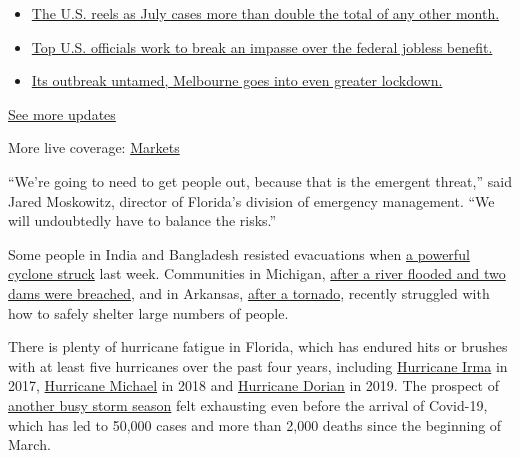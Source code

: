 \begin{itemize}
\tightlist
\item
  \href{https://www.nytimes.com/2020/08/01/world/coronavirus-covid-19.html?action=click\&pgtype=Article\&state=default\&region=MAIN_CONTENT_1\&context=storylines_live_updates\#link-34047410}{The
  U.S. reels as July cases more than double the total of any other
  month.}
\item
  \href{https://www.nytimes.com/2020/08/01/world/coronavirus-covid-19.html?action=click\&pgtype=Article\&state=default\&region=MAIN_CONTENT_1\&context=storylines_live_updates\#link-780ec966}{Top
  U.S. officials work to break an impasse over the federal jobless
  benefit.}
\item
  \href{https://www.nytimes.com/2020/08/01/world/coronavirus-covid-19.html?action=click\&pgtype=Article\&state=default\&region=MAIN_CONTENT_1\&context=storylines_live_updates\#link-2bc8948}{Its
  outbreak untamed, Melbourne goes into even greater lockdown.}
\end{itemize}

\href{https://www.nytimes.com/2020/08/01/world/coronavirus-covid-19.html?action=click\&pgtype=Article\&state=default\&region=MAIN_CONTENT_1\&context=storylines_live_updates}{See
more updates}

More live coverage:
\href{https://www.nytimes.com/live/2020/07/31/business/stock-market-today-coronavirus?action=click\&pgtype=Article\&state=default\&region=MAIN_CONTENT_1\&context=storylines_live_updates}{Markets}

``We're going to need to get people out, because that is the emergent
threat,'' said Jared Moskowitz, director of Florida's division of
emergency management. ``We will undoubtedly have to balance the risks.''

Some people in India and Bangladesh resisted evacuations when
\href{https://www.nytimes.com/2020/05/21/world/asia/cyclone-amphan-india-bangladesh.html}{a
powerful cyclone struck} last week. Communities in Michigan,
\href{https://www.nytimes.com/2020/05/20/us/michigan-flooding-dams-midland.html}{after
a river flooded and two dams were breached}, and in Arkansas,
\href{https://www.nytimes.com/2020/03/29/us/tornado-coronavirus-arkansas.html}{after
a tornado}, recently struggled with how to safely shelter large numbers
of people.

There is plenty of hurricane fatigue in Florida, which has endured hits
or brushes with at least five hurricanes over the past four years,
including
\href{https://www.nytimes.com/2017/09/09/us/irmas-fearsome-winds-reach-florida-shores-with-full-strike-yet-to-come.html}{Hurricane
Irma} in 2017,
\href{https://www.nytimes.com/2018/10/10/us/hurricane-michael-florida.html}{Hurricane
Michael} in 2018 and
\href{https://www.nytimes.com/2019/09/03/us/hurricane-dorian-updates.html}{Hurricane
Dorian} in 2019. The prospect of
\href{https://www.nytimes.com/2020/06/05/us/tropical-storm-cristobal-louisiana.html}{another
busy storm season} felt exhausting even before the arrival of Covid-19,
which has led to 50,000 cases and more than 2,000 deaths since the
beginning of March.

